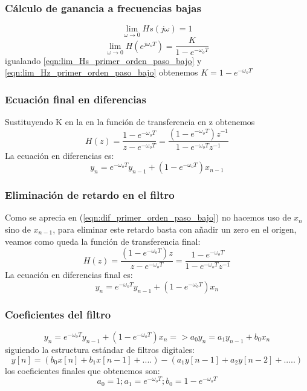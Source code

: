 \documentclass[titlepage]{article}
\begin{document}
\subsubsection{Cálculo de ganancia a frecuencias bajas}
\begin{equation}
\label{eqn:lim_Hs_primer_orden_paso_bajo}\lim_{\omega \to 0}Hs(j\omega)=1
\end{equation}
\begin{equation}
\label{eqn:lim_Hz_primer_orden_paso_bajo}\lim_{\omega \to 0}H(e^{j\omega_oT})=\frac{K}{1-e^{-\omega_oT}}
\end{equation}
\quad igualando \ref{eqn:lim_Hs_primer_orden_paso_bajo} y \ref{eqn:lim_Hz_primer_orden_paso_bajo} obtenemos $K=1-e^{-\omega_oT}$ 
\subsubsection{Ecuación final en diferencias}
Sustituyendo K en la en la función de transferencia en z obtenemos 
\begin{equation}
	H(z)=\frac{1-e^{-\omega_oT}}{z-e^{-\omega_oT}}=\frac{(1-e^{-\omega_oT})z^{-1}}{1-e^{-\omega_oT}z^{-1}} 
\end{equation}
La ecuación en diferencias es:
\begin{equation}
\label{eqn:dif_primer_orden_paso_bajo}y_n=e^{-\omega_oT}y_{n-1}+(1-e^{-\omega_oT})x_{n-1}
\end{equation}
\subsubsection{Eliminación de retardo en el filtro}
Como se aprecia en (\ref{eqn:dif_primer_orden_paso_bajo}) no hacemos uso de $x_n$ sino de $x_{n-1}$, para eliminar este retardo basta con añadir un zero en el origen, veamos como queda la función de transferencia final:
\begin{equation}
	H(z)=\frac{(1-e^{-\omega_oT})z}{z-e^{-\omega_oT}}=\frac{1-e^{-\omega_oT}}{1-e^{-\omega_oT}z^{-1}} 
\end{equation}
La ecuación en diferencias final es:
\begin{equation}
y_n=e^{-\omega_oT}y_{n-1}+(1-e^{-\omega_oT})x_{n}
\end{equation}
\subsubsection{Coeficientes del filtro}
\begin{equation}
y_n=e^{-\omega_oT}y_{n-1}+(1-e^{-\omega_oT})x_{n} => a_0y_{n}=a_1y_{n-1}+b_0x_n
\end{equation}
siguiendo la estructura estándar de filtros digitales:
\begin{equation}
y[n]=(b_0x[n]+b_1x[n-1]+ ....)-(a_1y[n-1] + a_2y[n-2] + .....)  
\end{equation}
los coeficientes finales que obtenemos son:
\begin{equation}
a_0=1;
a_1=e^{-\omega_oT};
b_0=1-e^{-\omega_oT}
\end{equation}
\end{document}
